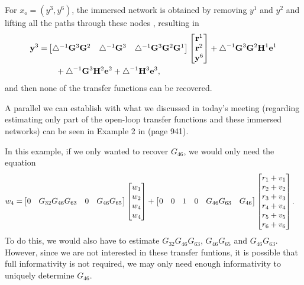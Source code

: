 \documentclass[11pt,a4paper]{article}
\begin{document}
For $x_o = (y^3,y^6)$, the immersed network is obtained by removing $y^1$ and $y^2$ and lifting all the paths through these nodes \cite{Dankers_predictor_input}, resulting in 
\begin{align*}
     \mathbf y^3 = & \begin{bmatrix} \mathbf \triangle^{-1} \mathbf G^3 \mathbf G^2 & \mathbf \triangle^{-1} \mathbf G^3 & \mathbf \triangle^{-1} \mathbf G^3 \mathbf G^2 \mathbf G^1 \end{bmatrix} \begin{bmatrix} \mathbf r^1 \\ \mathbf r^2 \\ \mathbf y^6 \end{bmatrix} + \mathbf \triangle^{-1} \mathbf G^3 \mathbf G^2 \mathbf H^1 \mathbf e^1 \\ & \quad + \mathbf \triangle^{-1} \mathbf G^3 \mathbf H^2 \mathbf e^2 + \mathbf \triangle^{-1} \mathbf H^3 \mathbf e^3,
\end{align*}
and then none of the transfer functions can be recovered.



A parallel we can establish with what we discussed in today’s meeting (regarding estimating only part of the open-loop transfer functions and these immersed networks) can be seen in Example 2 in \cite{Dankers_predictor_input} (page 941).

In this example, if we only wanted to recover $G_{46}$, we would only need the equation
\begin{align*}
    w_4 = &\begin{bmatrix} 0 & G_{32}G_{46}G_{63} & 0 & G_{46}G_{65} \end{bmatrix} \begin{bmatrix} w_1 \\ w_2 \\ w_4 \\ w_4 \end{bmatrix} + \begin{bmatrix} 0 & 0 & 1 & 0 & G_{46}G_{63} & G_{46} \end{bmatrix}  \begin{bmatrix} r_1 + v_1 \\ r_2 + v_2 \\ r_3 + v_3 \\ r_4 + v_4 \\ r_5 + v_5 \\ r_6 + v_6 \end{bmatrix}.
\end{align*}
To do this, we would also have to estimate $G_{32}G_{46}G_{63}$, $G_{46}G_{65}$ and $ G_{46}G_{63}$. However, since we are not interested in these transfer funtions, it is possible that full informativity is not required, we may only need enough informativity to uniquely determine $G_{46}$.


 
\end{document}

